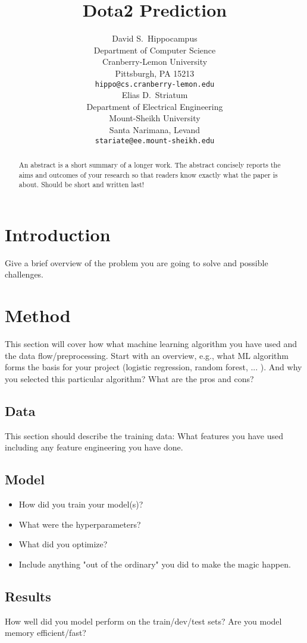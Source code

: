 \documentclass{article}
\title{Dota2 Prediction}
\author{
  David S.~Hippocampus \\
  Department of Computer Science\\
  Cranberry-Lemon University\\
  Pittsburgh, PA 15213 \\
  \texttt{hippo@cs.cranberry-lemon.edu} \\
   \And
 Elias D.~Striatum \\
  Department of Electrical Engineering\\
  Mount-Sheikh University\\
  Santa Narimana, Levand \\
  \texttt{stariate@ee.mount-sheikh.edu} \\
}
\begin{document}
\maketitle

\begin{abstract}
An abstract is a short summary of a longer work. The abstract concisely reports the aims and outcomes of your research so that readers know exactly what the paper is about. Should be short and written last!
\end{abstract}




\section{Introduction}
Give a brief overview of the problem you are going to solve and possible challenges. 

\section{Method}
This section will cover how what machine learning algorithm you have used and the data flow/preprocessing.
Start with an overview, e.g., what ML algorithm forms the basis for your project (logistic regression, random forest, ... ). And why you selected this particular algorithm? What are the pros and cons?

\subsection{Data}
This section should describe the training data: What features you have used including any feature engineering you have done. 

\subsection{Model}
\begin{itemize}
    \item How did you train your model(s)? 
    \item  What were the hyperparameters?
    \item  What did you optimize?
    \item  Include anything "out of the ordinary" you did to make the magic happen.
\end{itemize}

\subsection{Results}
How well did you model perform on the train/dev/test sets? Are you model memory efficient/fast?
\end{document}
